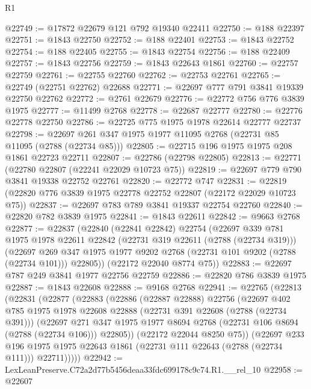 \begin{lexlean}{R1}
\begin{coremodule}
@22749 := @17872 @22679 @121 @792 @19340 @22411
@22750 := @188 @22397
@22751 := @1843 @22750
@22752 := @188 @22401
@22753 := @1843 @22752
@22754 := @188 @22405
@22755 := @1843 @22754
@22756 := @188 @22409
@22757 := @1843 @22756
@22759 := @1843 @22643 @1861
@22760 := @22757 @22759
@22761 := @22755 @22760
@22762 := @22753 @22761
@22765 := @22749 (@22751 @22762) @22688
@22771 := @22697 @777 @791 @3841 @19339 @22750 @22762
@22772 := @2761 @22679
@22776 := @22772 @756 @776 @3839 @1975
@22777 := @11499 @2768
@22778 := @22687 @22777
@22780 := @22776 @22778 @22750
@22786 := @22725 @775 @1975 @1978 @22614 @22777 @22737
@22798 := @22697 @261 @347 @1975 @1977 @11095 @2768 (@22731 @85 @11095 (@2788 (@22734 @85)))
@22805 := @22715 @196 @1975 @1975 @208 @1861 @22723 @22711
@22807 := @22786 (@22798 @22805)
@22813 := @22771 (@22780 @22807 (@22241 @22029 @10723 @75))
@22819 := @22697 @779 @790 @3841 @19338 @22752 @22761
@22820 := @22772 @747
@22831 := @22819 (@22820 @776 @3839 @1975 @22778 @22752 @22807 (@22172 @22029 @10723 @75))
@22837 := @22697 @783 @789 @3841 @19337 @22754 @22760
@22840 := @22820 @782 @3839 @1975
@22841 := @1843 @22611
@22842 := @9663 @2768
@22877 := @22837
    (@22840
      (@22841 @22842)
      @22754
      (@22697
        @339
        @781
        @1975
        @1978
        @22611
        @22842
        (@22731 @319 @22611 (@2788 (@22734 @319)))
        (@22697 @269 @347 @1975 @1977 @9202 @2768 (@22731 @101 @9202 (@2788 (@22734 @101))) @22805))
      (@22172 @22040 @8774 @75))
@22883 := @22697 @787 @249 @3841 @1977 @22756 @22759
@22886 := @22820 @786 @3839 @1975
@22887 := @1843 @22608
@22888 := @9168 @2768
@22941 := @22765
    (@22813
      (@22831
        (@22877
          (@22883
            (@22886
              (@22887 @22888)
              @22756
              (@22697
                @402
                @785
                @1975
                @1978
                @22608
                @22888
                (@22731 @391 @22608 (@2788 (@22734 @391)))
                (@22697
                  @271
                  @347
                  @1975
                  @1977
                  @8694
                  @2768
                  (@22731 @106 @8694 (@2788 (@22734 @106)))
                  @22805))
              (@22172 @22044 @8250 @75))
            (@22697
              @233
              @196
              @1975
              @1975
              @22643
              @1861
              (@22731 @111 @22643 (@2788 (@22734 @111)))
              @22711)))))
@22942 := LexLeanPreserve.C72a2d77b5456deaa33fdc699178c9c74.R1.__rel_10
@22958 := @22607

\end{coremodule}
\end{lexlean}
